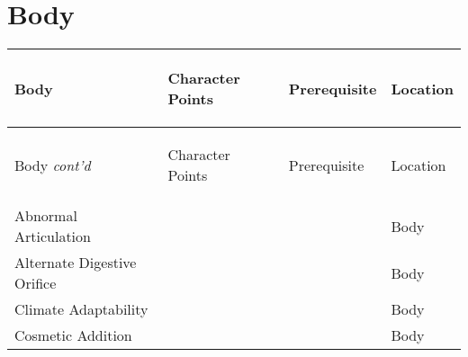 \documentclass[twoside]{book}
\begin{document}
    

\section{Body}
    
\begin{longtable}{p{1.25in}p{2em}ll} 
  Body
  &
  \begin{turn}{70}{Character Points}\end{turn}
          
  &
  \begin{turn}{70}{Prerequisite}\end{turn}
          
  &
  \begin{turn}{70}{Location}\end{turn}
          
  \\
  \hline
  \hline
  \endfirsthead
  Body \textit{cont'd}
        
  &
  \begin{turn}{70}{Character Points}\end{turn}
          
  &
  \begin{turn}{70}{Prerequisite}\end{turn}
          
  &
  \begin{turn}{70}{Location}\end{turn}
          
  \\
  \hline
  \endhead
      
  \raggedright
           Abnormal Articulation 
  &
  
  &
  
  &
   Body 
  \tabularnewline
      
  \raggedright
           Alternate Digestive Orifice
           
  &
  
  &
  
  &
   Body 
  \tabularnewline
      
  \raggedright
           Climate Adaptability 
  &
  
  &
  
  &
   Body 
  \tabularnewline
      
  \raggedright
           Cosmetic Addition 
  &
  
  &
  
  &
   Body 
  \tabularnewline
      

\end{longtable}
\end{document}
